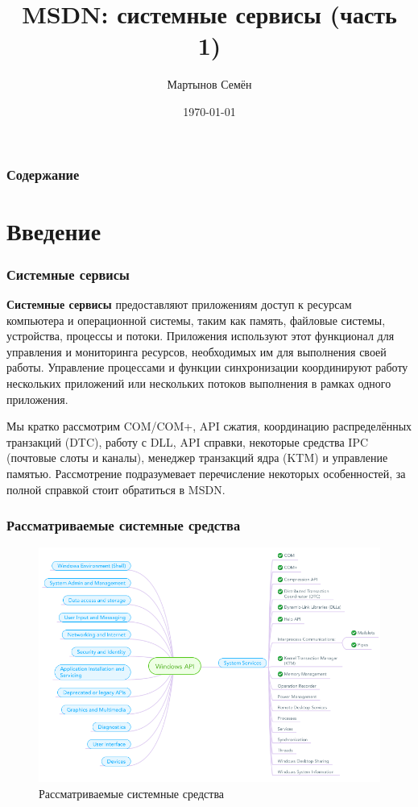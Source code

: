 \documentclass{beamer}
\title[Системное программирование]{MSDN: системные сервисы (часть 1)}
\author{Мартынов Семён}
\institute[СПб ПУ]
{
Санкт-Петербургский государственный политехнический университет \\
\medskip
\textit{semen.martynov@gmail.com}
}
\date{\today}
\begin{document}
\begin{frame}
\titlepage
\end{frame}

\begin{frame}
\frametitle{Содержание}
\tableofcontents
\end{frame}

\section{Введение}

\begin{frame}
\frametitle{Системные сервисы}

\textbf{Системные сервисы} предоставляют приложениям доступ к ресурсам компьютера и операционной системы, таким как память, файловые системы, устройства, процессы и потоки. Приложения используют этот функционал для управления и мониторинга ресурсов, необходимых им для выполнения своей работы. Управление процессами и функции синхронизации координируют работу нескольких приложений или нескольких потоков выполнения в рамках одного приложения.
\medskip

Мы кратко рассмотрим COM/COM+, API сжатия, координацию распределённых транзакций (DTC), работу с DLL, API справки, некоторые средства IPC (почтовые слоты и каналы), менеджер транзакций ядра (KTM) и управление памятью. Рассмотрение подразумевает перечисление некоторых особенностей, за полной справкой стоит обратиться в MSDN.

\end{frame}


\begin{frame}
\frametitle{Рассматриваемые системные средства}

\begin{figure}
\includegraphics[scale=0.4]{res/MindMap2}
\caption{Рассматриваемые системные средства}
\end{figure}

\end{frame}
\end{document}
